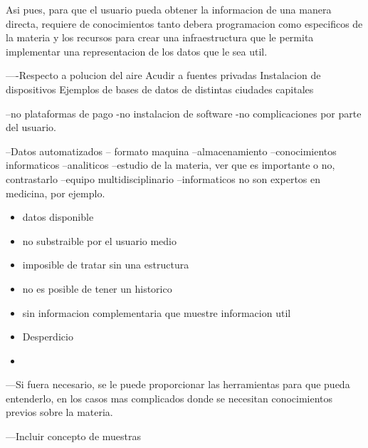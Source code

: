     
Asi pues, para que el usuario pueda obtener la informacion de una manera directa, requiere de conocimientos tanto debera
programacion como especificos de la materia y los recursos para crear una infraestructura que le permita implementar 
 una representacion de los datos que le sea util.
    
    
    
    
    
    ----Respecto a polucion del aire 
    Acudir a fuentes privadas
    Instalacion de dispositivos
    Ejemplos de bases de datos de distintas ciudades capitales


    --no plataformas de pago
-no instalacion de software
-no complicaciones por parte del usuario.

--Datos automatizados -- formato maquina
--almacenamiento
--conocimientos informaticos
--analiticos
--estudio de la materia, ver que es importante o no, contrastarlo
--equipo multidisciplinario
--informaticos no son expertos en medicina, por ejemplo.
\begin{itemize}

    \item datos disponible
    \item no substraible por el usuario medio
    \item imposible de tratar sin una estructura
    \item no es posible de tener un historico
    \item sin informacion complementaria que muestre informacion util
    \item Desperdicio
    \item \end{itemize}

---Si fuera necesario, se le puede proporcionar las herramientas para que pueda entenderlo, en los 
casos mas complicados donde se necesitan conocimientos previos sobre la materia.

---Incluir concepto de muestras
    